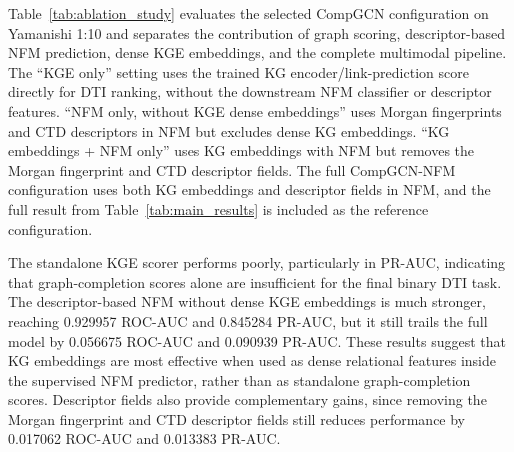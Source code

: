\begin{table}[!htbp]
\centering
\caption{Ablation results on Yamanishi 1:10.}
\label{tab:ablation_study}
\small
\setlength{\tabcolsep}{3pt}
\end{table}

Table~\ref{tab:ablation_study} evaluates the selected CompGCN configuration on Yamanishi 1:10 and separates the contribution of graph scoring, descriptor-based NFM prediction, dense KGE embeddings, and the complete multimodal pipeline. The ``KGE only'' setting uses the trained KG encoder/link-prediction score directly for DTI ranking, without the downstream NFM classifier or descriptor features. ``NFM only, without KGE dense embeddings'' uses Morgan fingerprints and CTD descriptors in NFM but excludes dense KG embeddings. ``KG embeddings + NFM only'' uses KG embeddings with NFM but removes the Morgan fingerprint and CTD descriptor fields. The full CompGCN-NFM configuration uses both KG embeddings and descriptor fields in NFM, and the full result from Table~\ref{tab:main_results} is included as the reference configuration.

The standalone KGE scorer performs poorly, particularly in PR-AUC, indicating that graph-completion scores alone are insufficient for the final binary DTI task. The descriptor-based NFM without dense KGE embeddings is much stronger, reaching 0.929957 ROC-AUC and 0.845284 PR-AUC, but it still trails the full model by 0.056675 ROC-AUC and 0.090939 PR-AUC. These results suggest that KG embeddings are most effective when used as dense relational features inside the supervised NFM predictor, rather than as standalone graph-completion scores. Descriptor fields also provide complementary gains, since removing the Morgan fingerprint and CTD descriptor fields still reduces performance by 0.017062 ROC-AUC and 0.013383 PR-AUC.

